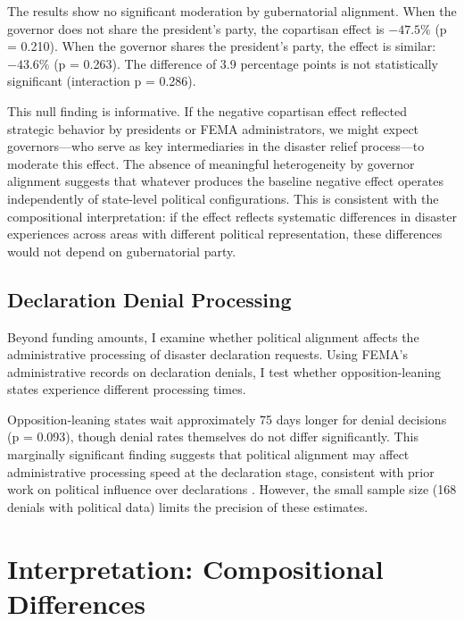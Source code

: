 \documentclass[12pt,letterpaper,oneside]{book}
\newcommand{\basepath}{g:/My Drive/Grad School}
\newcommand{\basepath}{basepath}
\begin{document}


The results show no significant moderation by gubernatorial alignment. When the governor does not share the president's party, the copartisan effect is $-47.5\%$ (p = 0.210). When the governor shares the president's party, the effect is similar: $-43.6\%$ (p = 0.263). The difference of 3.9 percentage points is not statistically significant (interaction p = 0.286).

This null finding is informative. If the negative copartisan effect reflected strategic behavior by presidents or FEMA administrators, we might expect governors---who serve as key intermediaries in the disaster relief process---to moderate this effect. The absence of meaningful heterogeneity by governor alignment suggests that whatever produces the baseline negative effect operates independently of state-level political configurations. This is consistent with the compositional interpretation: if the effect reflects systematic differences in disaster experiences across areas with different political representation, these differences would not depend on gubernatorial party.

\subsection{Declaration Denial Processing}

Beyond funding amounts, I examine whether political alignment affects the administrative processing of disaster declaration requests. Using FEMA's administrative records on declaration denials, I test whether opposition-leaning states experience different processing times.



Opposition-leaning states wait approximately 75 days longer for denial decisions (p = 0.093), though denial rates themselves do not differ significantly. This marginally significant finding suggests that political alignment may affect administrative processing speed at the declaration stage, consistent with prior work on political influence over declarations \citep{reeves2011political, gasper2011make}. However, the small sample size (168 denials with political data) limits the precision of these estimates.

\section{Interpretation: Compositional Differences}\label{sec:mechanisms}
\end{document}
